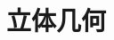 

\section{立体几何}

\subsection{ }

\subsubsection{ }

\begin{lstlisting}[language=C++]

\end{lstlisting}
